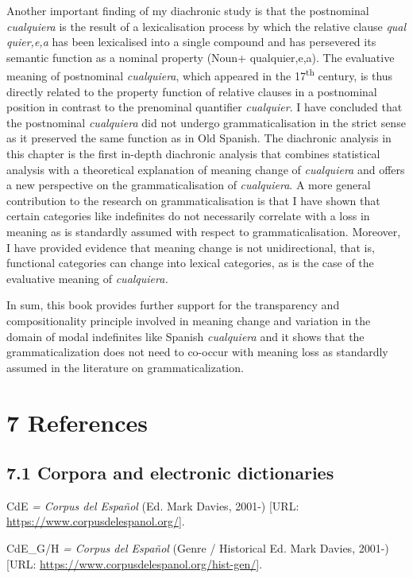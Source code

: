 \documentclass[output=paper]{langscibook}
\begin{document}
  Another important finding of my diachronic study is that the postnominal \textit{cualquiera} is the result of a lexicalisation process by which the relative clause \textit{qual} \textit{quier,e,a} has been lexicalised into a single compound and has persevered its semantic function as a nominal property (Noun+ qualquier,e,a). The evaluative meaning of postnominal \textit{cualquiera}, which appeared in the 17\textsuperscript{th} century, is thus directly related to the property function of relative clauses in a postnominal position in contrast to the prenominal quantifier \textit{cualquier}. I have concluded that the postnominal \textit{cualquiera} did not undergo grammaticalisation in the strict sense as it preserved the same function as in Old Spanish. The diachronic analysis in this chapter is the first in-depth diachronic analysis that combines statistical analysis with a theoretical explanation of meaning change of \textit{cualquiera} and offers a new perspective on the grammaticalisation of \textit{cualquiera}. A more general contribution to the research on grammaticalisation is that I have shown that certain categories like indefinites do not necessarily correlate with a loss in meaning as is standardly assumed with respect to grammaticalisation. Moreover, I have provided evidence that meaning change is not unidirectional, that is, functional categories can change into lexical categories, as is the case of the evaluative meaning of \textit{cualquiera.} 

  In sum, this book provides further support for the transparency and compositionality principle involved in meaning change and variation in the domain of modal indefinites like Spanish \textit{cualquiera} and it shows that the grammaticalization does not need to co-occur with meaning loss as standardly assumed in the literature on grammaticalization. 

\section{\textbf{7} References}
\subsection{7.1 Corpora and electronic dictionaries}

CdE \textit{= Corpus del Español} (Ed. Mark Davies, 2001-) [URL: \url{https://www.corpusdelespanol.org/}].

CdE\_G/H \textit{= Corpus del Español} (Genre / Historical Ed. Mark Davies, 2001-) [URL: \url{https://www.corpusdelespanol.org/hist-gen/}].
\end{document}
